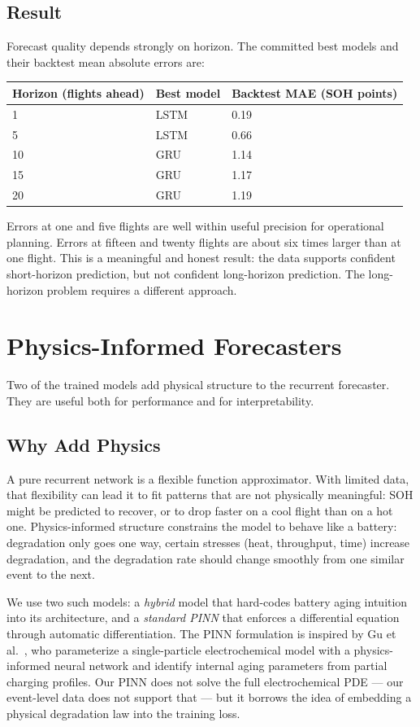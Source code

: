 \documentclass[11pt]{article}
\begin{document}
\subsection{Result}

Forecast quality depends strongly on horizon. The committed best models
and their backtest mean absolute errors are:
\begin{center}
\begin{tabular}{lll}
\toprule
Horizon (flights ahead) & Best model & Backtest MAE (SOH points) \\
\midrule
1 & LSTM & 0.19 \\
5 & LSTM & 0.66 \\
10 & GRU & 1.14 \\
15 & GRU & 1.17 \\
20 & GRU & 1.19 \\
\bottomrule
\end{tabular}
\end{center}
Errors at one and five flights are well within useful precision for
operational planning. Errors at fifteen and twenty flights are about
six times larger than at one flight. This is a meaningful and honest
result: the data supports confident short-horizon prediction, but not
confident long-horizon prediction. The long-horizon problem requires a
different approach.

\section{Physics-Informed Forecasters}

Two of the trained models add physical structure to the recurrent
forecaster. They are useful both for performance and for
interpretability.

\subsection{Why Add Physics}

A pure recurrent network is a flexible function approximator. With
limited data, that flexibility can lead it to fit patterns that are not
physically meaningful: SOH might be predicted to recover, or to drop
faster on a cool flight than on a hot one. Physics-informed structure
constrains the model to behave like a battery: degradation only goes
one way, certain stresses (heat, throughput, time) increase
degradation, and the degradation rate should change smoothly from one
similar event to the next.

We use two such models: a \emph{hybrid} model that hard-codes battery
aging intuition into its architecture, and a \emph{standard PINN} that
enforces a differential equation through automatic differentiation. The
PINN formulation is inspired by Gu et al.~\cite{gu2025ppinn}, who
parameterize a single-particle electrochemical model with a
physics-informed neural network and identify internal aging parameters
from partial charging profiles. Our PINN does not solve the full
electrochemical PDE --- our event-level data does not support that ---
but it borrows the idea of embedding a physical degradation law into the
training loss.
\end{document}
